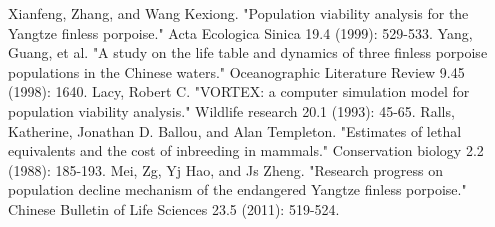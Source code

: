 \documentclass[12pt]{article}  %
\begin{document}
\begin{thebibliography}{99}
 Xianfeng, Zhang, and Wang Kexiong. "Population viability analysis for the Yangtze finless porpoise." Acta Ecologica Sinica 19.4 (1999): 529-533.
 Yang, Guang, et al. "A study on the life table and dynamics of three finless porpoise populations in the Chinese waters." Oceanographic Literature Review 9.45 (1998): 1640.
 Lacy, Robert C. "VORTEX: a computer simulation model for population viability analysis." Wildlife research 20.1 (1993): 45-65.
 Ralls, Katherine, Jonathan D. Ballou, and Alan Templeton. "Estimates of lethal equivalents and the cost of inbreeding in mammals." Conservation biology 2.2 (1988): 185-193.
 Mei, Zg, Yj Hao, and Js Zheng. "Research progress on population decline mechanism of the endangered Yangtze finless porpoise." Chinese Bulletin of Life Sciences 23.5 (2011): 519-524.

\end{thebibliography}
\end{document}
